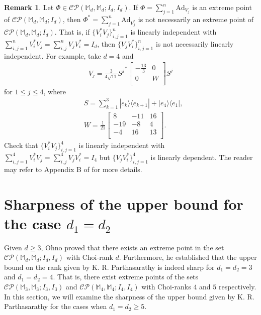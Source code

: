 \documentclass[10pt,reqno]{amsart}
\theoremstyle{definition}
\newtheorem{rmk}[defn]{Remark}
\theoremstyle{plain}
\theoremstyle{remark}
\newcommand{\mbb}[1]{\mathbb{#1}}
\newcommand{\msc}[1]{\mathscr{#1}}
\newcommand{\M}[1]{\mbb{M}_{#1}}%
\newcommand{\ranko}[2]{|{#1}\rangle\langle{#2}|}
\numberwithin{equation}{section}%
\begin{document}
   
   
   \begin{rmk}
   	Let $\Phi\in\msc{CP}(\M{d},\M{d}; I_d, I_d)$. If $\Phi=\sum_{j=1}^{n}\mathrm{Ad}_{V_j}$ is an extreme point of $\msc{CP}(\M{d},\M{d}; I_d)$, then $\Phi^*=\sum_{j=1}^{n}\mathrm{Ad}_{V_j^*}$ is not necessarily an extreme point of $\msc{CP}(\M{d},\M{d}; I_d)$. That is, if $\{V_i^*V_j\}_{i,j=1}^n$ is linearly independent with $\sum_{i,j=1}^nV_i^*V_j=\sum_{i,j}^nV_jV_i^*=I_d$, then $\{V_jV_i^*\}_{i,j=1}^n$ is not necessarily linearly independent. For example, take $d=4$ and 
    \begin{align*}
        V_j=\frac{3}{4\sqrt{11}}{S^j}^*\begin{bmatrix}
			-\frac{13}{3} & 0\\
			0 & W\\
		\end{bmatrix}S^j
    \end{align*}
    for $1\leq j\leq 4$, where
    \begin{align*}
        &S=\sum_{k=1}^3\ranko{e_k}{e_{k+1}}+\ranko{e_4}{e_1},\\
        &W=\frac{1}{21}\begin{bmatrix}
			8 & -11 & 16\\
			-19 & -8 & 4\\
            -4 & 16 & 13\\
		\end{bmatrix}.
    \end{align*}
    Check that $\{V_i^*V_j\}_{i,j=1}^4$ is linearly independent with $\sum_{i,j=1}^4V_i^*V_j=\sum_{i,j}^4V_jV_i^*=I_4$ but $\{V_jV_i^*\}_{i,j=1}^4$ is linearly dependent. The reader may refer to Appendix B of \cite{HMR} for more details.
   \end{rmk}
   
   
   
\section{Sharpness of the upper bound for the case $d_1=d_2$}\label{sharpness for d_1=d_2}




Given $d\geq 3$, Ohno \cite{Ohno10} proved that there exists an extreme point in the set $\msc{CP}(\M{d},\M{d}; I_{d}, I_{d})$ with Choi-rank $d$. Furthermore, he established that the upper bound on the rank given by K. R. Parthasarathy is indeed sharp for $d_1 = d_2 = 3$ and $d_1 = d_2 = 4$. That is, there exist extreme points of the sets $\msc{CP}(\M{3},\M{3}; I_{3}, I_{3})$ and $\msc{CP}(\M{4},\M{4}; I_{4}, I_{4})$ with Choi-ranks $4$ and $5$ respectively. In this section, we will examine the sharpness of the upper bound given by K. R. Parthasarathy for the cases when $d_1=d_2\geq 5$. 
\end{document}
